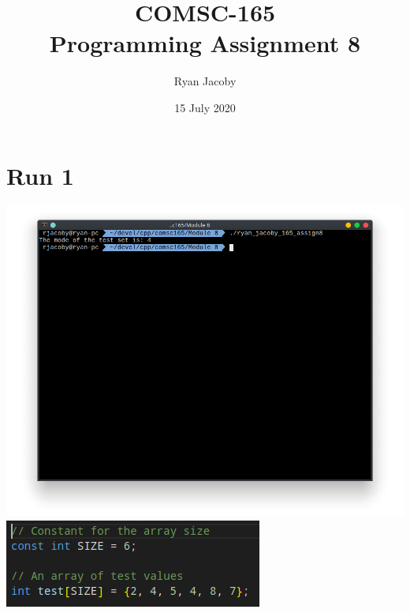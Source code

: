 \documentclass[letterpaper, 11pt]{article}
\title{COMSC-165 \\ Programming Assignment 8}
\author{Ryan Jacoby}
\date{15 July 2020}
\begin{document}
\maketitle

\section*{Run 1}
\includegraphics[scale=0.5]{run1.png} \\
\includegraphics[scale=0.5]{run1_2.png}
\end{document}
